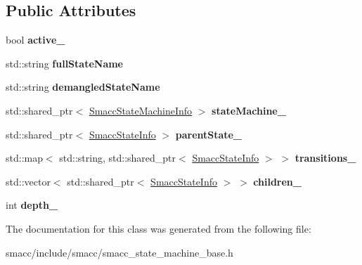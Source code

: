 \subsection*{Public Attributes}
\begin{DoxyCompactItemize}
\item 
\mbox{\label{classsmacc_1_1SmaccStateInfo_a12b5db7f92c7d1bbef492b6f33d2680d}} 
bool {\bfseries active\+\_\+}
\item 
\mbox{\label{classsmacc_1_1SmaccStateInfo_a3d9d81ebeda351fba21665bb7b9ff148}} 
std\+::string {\bfseries full\+State\+Name}
\item 
\mbox{\label{classsmacc_1_1SmaccStateInfo_ad36e29f3984e40d36664567f9703239a}} 
std\+::string {\bfseries demangled\+State\+Name}
\item 
\mbox{\label{classsmacc_1_1SmaccStateInfo_af9884b3fda41fbc87abf9908b8bd72e7}} 
std\+::shared\+\_\+ptr$<$ \hyperlink{classsmacc_1_1SmaccStateMachineInfo}{Smacc\+State\+Machine\+Info} $>$ {\bfseries state\+Machine\+\_\+}
\item 
\mbox{\label{classsmacc_1_1SmaccStateInfo_ae19f4efbeb2ca665b320df80766d9209}} 
std\+::shared\+\_\+ptr$<$ \hyperlink{classsmacc_1_1SmaccStateInfo}{Smacc\+State\+Info} $>$ {\bfseries parent\+State\+\_\+}
\item 
\mbox{\label{classsmacc_1_1SmaccStateInfo_ad9a57f1532506ff82a2885e854f6132f}} 
std\+::map$<$ std\+::string, std\+::shared\+\_\+ptr$<$ \hyperlink{classsmacc_1_1SmaccStateInfo}{Smacc\+State\+Info} $>$ $>$ {\bfseries transitions\+\_\+}
\item 
\mbox{\label{classsmacc_1_1SmaccStateInfo_a7773f1d9e865a839b0bfed087bbb93ba}} 
std\+::vector$<$ std\+::shared\+\_\+ptr$<$ \hyperlink{classsmacc_1_1SmaccStateInfo}{Smacc\+State\+Info} $>$ $>$ {\bfseries children\+\_\+}
\item 
\mbox{\label{classsmacc_1_1SmaccStateInfo_a3f44d5af069d0f37ed63b3101b330a65}} 
int {\bfseries depth\+\_\+}
\end{DoxyCompactItemize}


The documentation for this class was generated from the following file\+:\begin{DoxyCompactItemize}
\item 
smacc/include/smacc/smacc\+\_\+state\+\_\+machine\+\_\+base.\+h\end{DoxyCompactItemize}
